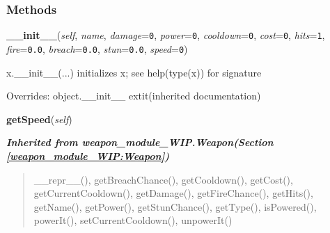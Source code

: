 
  \subsubsection{Methods}

    \vspace{0.5ex}

\hspace{.8\funcindent}\begin{boxedminipage}{\funcwidth}

    \raggedright \textbf{\_\_init\_\_}(\textit{self}, \textit{name}, \textit{damage}={\tt 0}, \textit{power}={\tt 0}, \textit{cooldown}={\tt 0}, \textit{cost}={\tt 0}, \textit{hits}={\tt 1}, \textit{fire}={\tt 0.0}, \textit{breach}={\tt 0.0}, \textit{stun}={\tt 0.0}, \textit{speed}={\tt 0})

\setlength{\parskip}{2ex}
    x.\_\_init\_\_(...) initializes x; see help(type(x)) for signature

\setlength{\parskip}{1ex}
      Overrides: object.\_\_init\_\_ 	extit{(inherited documentation)}

    \end{boxedminipage}

    \label{weapon_module_WIP:Ion:getSpeed}

    \vspace{0.5ex}

\hspace{.8\funcindent}\begin{boxedminipage}{\funcwidth}

    \raggedright \textbf{getSpeed}(\textit{self})

\setlength{\parskip}{2ex}
\setlength{\parskip}{1ex}
    \end{boxedminipage}


\large{\textbf{\textit{Inherited from weapon\_module\_WIP.Weapon\textit{(Section \ref{weapon_module_WIP:Weapon})}}}}

\begin{quote}
\_\_repr\_\_(), getBreachChance(), getCooldown(), getCost(), getCurrentCooldown(), getDamage(), getFireChance(), getHits(), getName(), getPower(), getStunChance(), getType(), isPowered(), powerIt(), setCurrentCooldown(), unpowerIt()
\end{quote}

